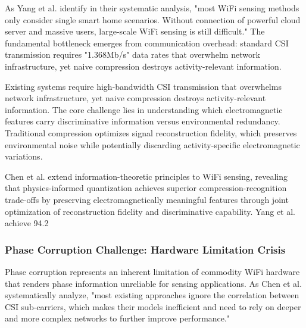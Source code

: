 \documentclass[journal]{IEEEtran}
\begin{document}
As Yang et al. \cite{chen2024efficientfi} identify in their systematic analysis, "most WiFi sensing methods only consider single smart home scenarios. Without connection of powerful cloud server and massive users, large-scale WiFi sensing is still difficult." The fundamental bottleneck emerges from communication overhead: standard CSI transmission requires "1.368Mb/s" data rates that overwhelm network infrastructure, yet naive compression destroys activity-relevant information.

Existing systems require high-bandwidth CSI transmission that overwhelms network infrastructure, yet naive compression destroys activity-relevant information. The core challenge lies in understanding which electromagnetic features carry discriminative information versus environmental redundancy. Traditional compression optimizes signal reconstruction fidelity, which preserves environmental noise while potentially discarding activity-specific electromagnetic variations.

Chen et al. extend information-theoretic principles to WiFi sensing, revealing that physics-informed quantization achieves superior compression-recognition trade-offs by preserving electromagnetically meaningful features through joint optimization of reconstruction fidelity and discriminative capability. Yang et al. achieve 94.2%

\subsubsection{Phase Corruption Challenge: Hardware Limitation Crisis}

Phase corruption represents an inherent limitation of commodity WiFi hardware that renders phase information unreliable for sensing applications. As Chen et al. \cite{chen2024wiphase} systematically analyze, "most existing approaches ignore the correlation between CSI sub-carriers, which makes their models inefficient and need to rely on deeper and more complex networks to further improve performance."
\end{document}
